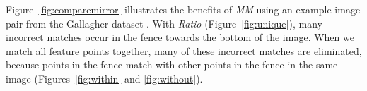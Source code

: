 \documentclass{article}
\begin{document}


Figure~\ref{fig:comparemirror} illustrates the benefits of \emph{MM} 
using an example image pair from the Gallagher dataset 
\cite{gallagher2008}.
With \emph{Ratio} (Figure~\ref{fig:unique}), many incorrect matches occur 
in the fence towards the bottom of the image.
When we match all feature points together, many of these incorrect 
matches are eliminated, because points in the fence match with other 
points in the fence in the same image (Figures~\ref{fig:within} and
\ref{fig:without}).
\end{document}
